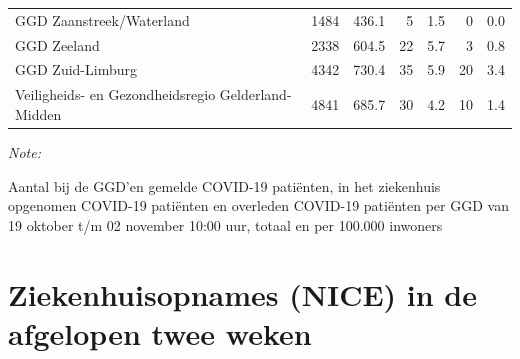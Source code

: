 \documentclass[
  english,
  man,floatsintext]{apa6}
\begin{document}
\begin{table}
\begin{threeparttable}
\begin{tabular}{lrrrrrr}
GGD Zaanstreek/Waterland & 1484 & 436.1 & 5 & 1.5 & 0 & 0.0\\
GGD Zeeland & 2338 & 604.5 & 22 & 5.7 & 3 & 0.8\\
GGD Zuid-Limburg & 4342 & 730.4 & 35 & 5.9 & 20 & 3.4\\
Veiligheids- en Gezondheidsregio Gelderland-Midden & 4841 & 685.7 & 30 & 4.2 & 10 & 1.4\\
\bottomrule
\end{tabular}
\begin{tablenotes}
\item \textit{Note: } 
\item Aantal bij de GGD’en gemelde COVID-19 patiënten, in het ziekenhuis opgenomen COVID-19 patiënten en overleden COVID-19 patiënten per GGD van 19 oktober t/m 02 november 10:00 uur, totaal en per 100.000 inwoners
\end{tablenotes}
\end{threeparttable}
\endgroup{}
\end{table}

\newpage

\hypertarget{ziekenhuisopnames-nice-in-de-afgelopen-twee-weken}{%
\section{Ziekenhuisopnames (NICE) in de afgelopen twee weken}\label{ziekenhuisopnames-nice-in-de-afgelopen-twee-weken}}
\end{document}
